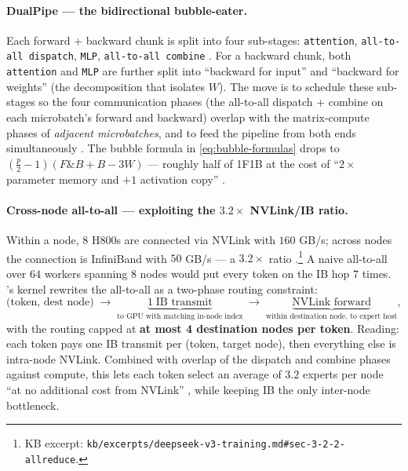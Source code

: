 \paragraph{DualPipe --- the bidirectional bubble-eater.} Each forward
+ backward chunk is split into four sub-stages: \texttt{attention},
\texttt{all-to-all dispatch}, \texttt{MLP}, \texttt{all-to-all
combine} \citep[\S 3.2.1]{deepseek-v3}. For a backward chunk, both
\texttt{attention} and \texttt{MLP} are further split into ``backward
for input'' and ``backward for weights'' (the  decomposition
that isolates $W$). The   move is to schedule these
sub-stages so the four communication phases (the all-to-all dispatch +
combine on each microbatch's forward and backward) overlap with the
matrix-compute phases of \emph{adjacent microbatches}, and to feed the
pipeline from both ends simultaneously \citep[\S 3.2.1]{deepseek-v3}.
The bubble formula in \cref{eq:bubble-formulas} drops to
$(\tfrac{p}{2} - 1)(F\mathbin{\text{\&}}B + B - 3W)$ --- roughly half of 1F1B at the
cost of ``$2\times$ parameter memory and $+1$ activation copy''
\citep[\S 3.2.1]{deepseek-v3}.

\paragraph{Cross-node all-to-all --- exploiting the $3.2\times$
NVLink/IB ratio.} Within a node, $8$ H800s are connected via NVLink
with $160$ GB/s; across nodes the connection is InfiniBand with
$50$ GB/s --- a $3.2\times$ ratio
\citep[\S 3.2.2]{deepseek-v3}.\footnote{KB excerpt:
\nolinkurl{kb/excerpts/deepseek-v3-training.md#sec-3-2-2-allreduce}.} A
naive  all-to-all over $64$ workers spanning $8$ nodes would put
every token on the IB hop $7$ times. 's kernel rewrites the
all-to-all as a two-phase routing constraint:
\begin{equation}
\text{(token, dest node)} \;\to\; \underbrace{1\;\text{IB transmit}}_{\text{to GPU with matching in-node index}}
\;\to\; \underbrace{\text{NVLink forward}}_{\text{within destination node, to expert host}},
\label{eq:dsv3-routing}
\end{equation}
with the routing capped at \textbf{at most 4 destination nodes per
token}. Reading: each token pays one IB transmit per (token, target
node), then everything else is intra-node NVLink. Combined with
 overlap of the dispatch and combine phases against compute,
this lets each token select an average of $3.2$ experts per node ``at
no additional cost from NVLink'' \citep[\S 3.2.2]{deepseek-v3}, while
keeping IB the only inter-node bottleneck.

